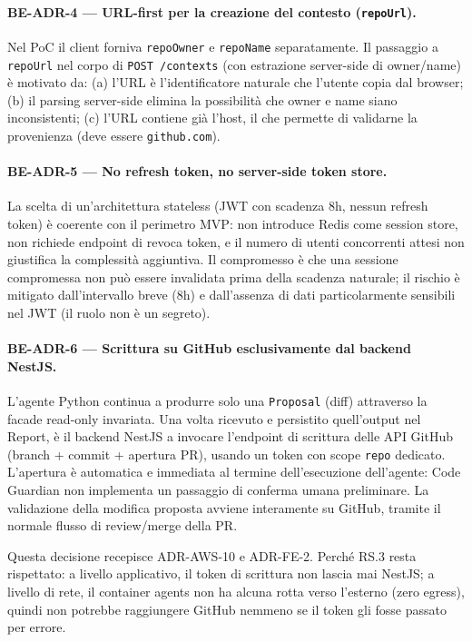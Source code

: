 \documentclass[11pt,a4paper]{article}
\begin{document}
\paragraph{BE-ADR-4 --- URL-first per la creazione del contesto (\texttt{repoUrl}).}
Nel PoC il client forniva \texttt{repoOwner} e \texttt{repoName} separatamente. Il passaggio a \texttt{repoUrl} nel corpo di \texttt{POST /contexts} (con estrazione server-side di owner/name) è motivato da: (a) l'URL è l'identificatore naturale che l'utente copia dal browser; (b) il parsing server-side elimina la possibilità che owner e name siano inconsistenti; (c) l'URL contiene già l'host, il che permette di validarne la provenienza (deve essere \texttt{github.com}).

\paragraph{BE-ADR-5 --- No refresh token, no server-side token store.}
La scelta di un'architettura stateless (JWT con scadenza 8h, nessun refresh token) è coerente con il perimetro MVP: non introduce Redis come session store, non richiede endpoint di revoca token, e il numero di utenti concorrenti attesi non giustifica la complessità aggiuntiva. Il compromesso è che una sessione compromessa non può essere invalidata prima della scadenza naturale; il rischio è mitigato dall'intervallo breve (8h) e dall'assenza di dati particolarmente sensibili nel JWT (il ruolo non è un segreto).

\paragraph{BE-ADR-6 --- Scrittura su GitHub esclusivamente dal backend NestJS.}
L'agente Python continua a produrre solo una \texttt{Proposal} (diff) attraverso la facade read-only invariata. Una volta ricevuto e persistito quell'output nel Report, è il backend NestJS a invocare l'endpoint di scrittura delle API GitHub (branch + commit + apertura PR), usando un token con scope \texttt{repo} dedicato. L'apertura è automatica e immediata al termine dell'esecuzione dell'agente: Code Guardian non implementa un passaggio di conferma umana preliminare. La validazione della modifica proposta avviene interamente su GitHub, tramite il normale flusso di review/merge della PR.

Questa decisione recepisce ADR-AWS-10 e ADR-FE-2. Perché RS.3 resta rispettato: a livello applicativo, il token di scrittura non lascia mai NestJS; a livello di rete, il container agents non ha alcuna rotta verso l'esterno (zero egress), quindi non potrebbe raggiungere GitHub nemmeno se il token gli fosse passato per errore.
\end{document}

